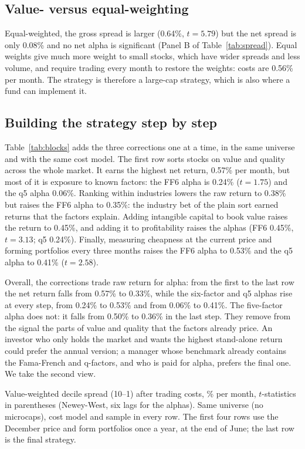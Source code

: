\documentclass[12pt,a4paper]{article}
\newcommand{\tablenote}[1]{\par\vspace{4pt}\begin{minipage}{\linewidth}\footnotesize\singlespacing #1\end{minipage}}
\begin{document}
\subsection{Value- versus equal-weighting}

Equal-weighted, the gross spread is larger (0.64\%, $t=5.79$) but the net spread is only 0.08\% and
no net alpha is significant (Panel B of Table~\ref{tab:spread}). Equal weights give much more weight
to small stocks, which have wider spreads and less volume, and require trading every month to restore
the weights: costs are 0.56\% per month. The strategy is therefore a large-cap strategy, which is
also where a fund can implement it.

\subsection{Building the strategy step by step}

Table~\ref{tab:blocks} adds the three corrections one at a time, in the same universe and with the
same cost model. The first row sorts stocks on value and quality across the whole market. It earns
the highest net return, 0.57\% per month, but most of it is exposure to known factors: the FF6 alpha
is 0.24\% ($t=1.75$) and the q5 alpha 0.06\%. Ranking within industries lowers the raw return to
0.38\% but raises the FF6 alpha to 0.35\%: the industry bet of the plain sort earned returns that the
factors explain. Adding intangible capital to book value raises the return to 0.45\%, and adding it
to profitability raises the alphas (FF6 0.45\%, $t=3.13$; q5 0.24\%). Finally, measuring cheapness at
the current price and forming portfolios every three months raises the FF6 alpha to 0.53\% and the
q5 alpha to 0.41\% ($t=2.58$).

Overall, the corrections trade raw return for alpha: from the first to the last row the net return
falls from 0.57\% to 0.33\%, while the six-factor and q5 alphas rise at every step, from 0.24\% to
0.53\% and from 0.06\% to 0.41\%. The five-factor alpha does not: it falls from 0.50\% to 0.36\% in
the last step. They remove from the signal the parts of value and quality that the factors
already price. An investor who only holds the market and wants the highest stand-alone return could
prefer the annual version; a manager whose benchmark already contains the Fama-French and q-factors,
and who is paid for alpha, prefers the final one. We take the second view.

\begin{table}[H]
\centering
\caption{Building the strategy one correction at a time, 1963--2015}\label{tab:blocks}
\resizebox{\textwidth}{!}{}
\tablenote{Value-weighted decile spread (10--1) after trading costs, \% per month, $t$-statistics in
parentheses (Newey-West, six lags for the alphas). Same universe (no microcaps), cost model and
sample in every row. The first four rows use the December price and form portfolios once a year, at
the end of June; the last row is the final strategy.}
\end{table}
\end{document}
